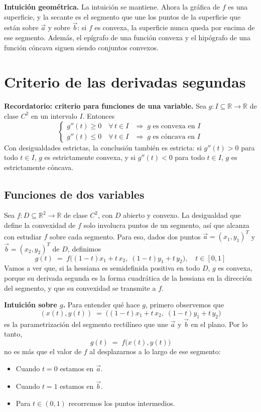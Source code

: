 \documentclass{article}
\newcommand{\R}{\ensuremath{\mathbb{R}}}
\newcommand{\vect}[1]{\vec{#1}}
\begin{document}
\noindent\textbf{Intuición geométrica.} La intuición se mantiene. Ahora la gráfica de \(f\) es una superficie, y la secante es el segmento que une los puntos de la superficie que están sobre \(\vect{a}\) y sobre \(\vect{b}\): si \(f\) es convexa, la superficie nunca queda por encima de ese segmento. Además, el epígrafo de una función convexa y el hipógrafo de una función cóncava siguen siendo conjuntos convexos.

\section*{Criterio de las derivadas segundas}

\noindent\textbf{Recordatorio: criterio para funciones de una variable.} Sea \(g\colon I\subseteq\R\to\R\) de clase \(C^2\) en un intervalo \(I\). Entonces
\[
\begin{cases}
g''(t)\ge0\quad\forall\,t\in I
&\Longrightarrow\;g\text{ es convexa en }I\\[6pt]
g''(t)\le0\quad\forall\,t\in I
&\Longrightarrow\;g\text{ es cóncava en }I
\end{cases}
\]
Con desigualdades estrictas, la conclusión también es estricta: si \(g''(t)>0\) para todo \(t\in I\), \(g\) es estrictamente convexa, y si \(g''(t)<0\) para todo \(t\in I\), \(g\) es estrictamente cóncava.

\subsection*{Funciones de dos variables}

Sea \(f\colon D\subseteq\R^2\to\R\) de clase \(C^2\), con \(D\) abierto y convexo. La desigualdad que define la convexidad de \(f\) solo involucra puntos de un segmento, así que alcanza con estudiar \(f\) sobre cada segmento. Para eso, dados dos puntos \(\vect{a}=(x_1,y_1)^T\) y \(\vect{b}=(x_2,y_2)^T\) de \(D\), definimos
\[
g(t) \;=\; f\bigl((1-t)x_1 + t\,x_2,\;(1-t)y_1 + t\,y_2\bigr),
\quad t\in[0,1]
\]
Vamos a ver que, si la hessiana es semidefinida positiva en todo \(D\), \(g\) es convexa, porque su derivada segunda es la forma cuadrática de la hessiana en la dirección del segmento, y que su convexidad se transmite a \(f\).

\medskip
\noindent\textbf{Intuición sobre \(g\).}
Para entender qué hace \(g\), primero observemos que
\[
(x(t),y(t)) \;=\;\bigl((1-t)x_1 + t\,x_2,\;(1-t)y_1 + t\,y_2\bigr)
\]
es la parametrización del segmento rectilíneo que une \(\vect{a}\) y \(\vect{b}\) en el plano. Por lo tanto,
\[
g(t) \;=\; f\bigl(x(t),y(t)\bigr)
\]
no es más que el valor de \(f\) al desplazarnos a lo largo de ese segmento:
\begin{itemize}
    \item Cuando \(t=0\) estamos en \(\vect{a}\).
    \item Cuando \(t=1\) estamos en \(\vect{b}\).
    \item Para \(t\in(0,1)\) recorremos los puntos intermedios.
\end{itemize}
\end{document}
